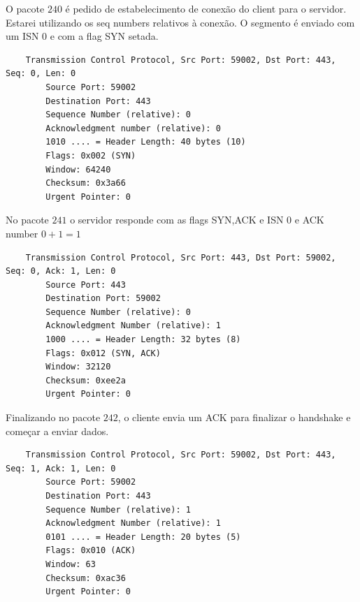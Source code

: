 
\begin{solution}
    O pacote $240$ é pedido de estabelecimento de conexão do client para o servidor.
    Estarei utilizando os seq numbers relativos à conexão.
    O segmento é enviado com um ISN 0 e com a flag SYN setada.\\
    \begin{verbatim}
    Transmission Control Protocol, Src Port: 59002, Dst Port: 443, Seq: 0, Len: 0
        Source Port: 59002
        Destination Port: 443
        Sequence Number (relative): 0
        Acknowledgment number (relative): 0
        1010 .... = Header Length: 40 bytes (10)
        Flags: 0x002 (SYN)
        Window: 64240
        Checksum: 0x3a66
        Urgent Pointer: 0
    \end{verbatim}

    No pacote $241$ o servidor responde com as flags SYN,ACK e ISN $0$ e ACK number $0 + 1 = 1$
    \begin{verbatim}
    Transmission Control Protocol, Src Port: 443, Dst Port: 59002, Seq: 0, Ack: 1, Len: 0
        Source Port: 443
        Destination Port: 59002
        Sequence Number (relative): 0
        Acknowledgment Number (relative): 1
        1000 .... = Header Length: 32 bytes (8)
        Flags: 0x012 (SYN, ACK)
        Window: 32120
        Checksum: 0xee2a
        Urgent Pointer: 0
    \end{verbatim}

    Finalizando no pacote $242$, o cliente envia um ACK para finalizar o handshake e começar a enviar dados.
    \begin{verbatim}
    Transmission Control Protocol, Src Port: 59002, Dst Port: 443, Seq: 1, Ack: 1, Len: 0
        Source Port: 59002
        Destination Port: 443
        Sequence Number (relative): 1 
        Acknowledgment Number (relative): 1
        0101 .... = Header Length: 20 bytes (5)
        Flags: 0x010 (ACK)
        Window: 63
        Checksum: 0xac36
        Urgent Pointer: 0
    \end{verbatim}   
\end{solution}